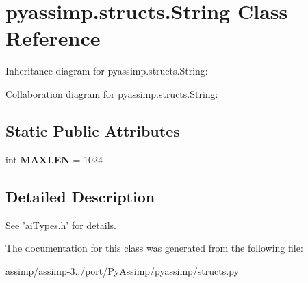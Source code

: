\hypertarget{classpyassimp_1_1structs_1_1_string}{\section{pyassimp.\+structs.\+String Class Reference}
\label{classpyassimp_1_1structs_1_1_string}
}


Inheritance diagram for pyassimp.\+structs.\+String\+:


Collaboration diagram for pyassimp.\+structs.\+String\+:
\subsection*{Static Public Attributes}
\begin{DoxyCompactItemize}
\item 
\hypertarget{classpyassimp_1_1structs_1_1_string_ad8261e46148226d7fe2b297671888f91}{int {\bfseries M\+A\+X\+L\+E\+N} = 1024}\label{classpyassimp_1_1structs_1_1_string_ad8261e46148226d7fe2b297671888f91}

\end{DoxyCompactItemize}


\subsection{Detailed Description}
\begin{DoxyVerb}See 'aiTypes.h' for details.
\end{DoxyVerb}
 

The documentation for this class was generated from the following file\+:\begin{DoxyCompactItemize}
\item 
assimp/assimp-\/3../port/\+Py\+Assimp/pyassimp/structs.\+py\end{DoxyCompactItemize}
